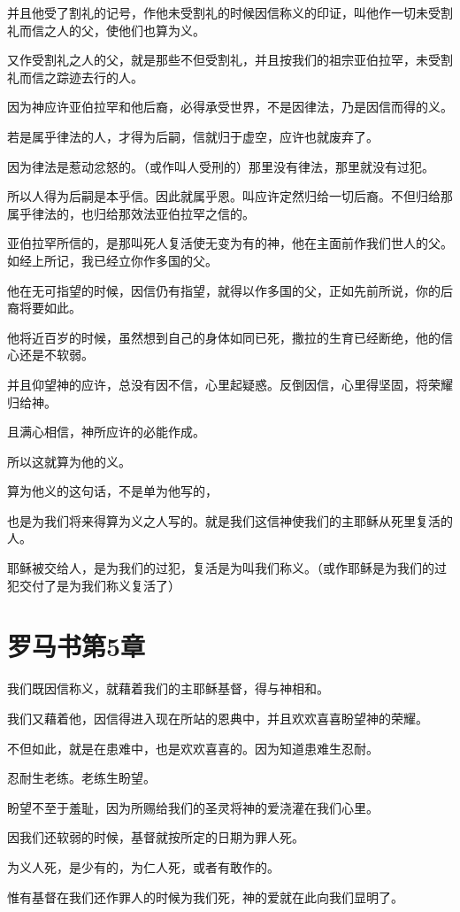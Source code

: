 \documentclass[12pt,oneside]{book}
\begin{document}
并且他受了割礼的记号，作他未受割礼的时候因信称义的印证，叫他作一切未受割礼而信之人的父，使他们也算为义。

又作受割礼之人的父，就是那些不但受割礼，并且按我们的祖宗亚伯拉罕，未受割礼而信之踪迹去行的人。

因为神应许亚伯拉罕和他后裔，必得承受世界，不是因律法，乃是因信而得的义。

若是属乎律法的人，才得为后嗣，信就归于虚空，应许也就废弃了。

因为律法是惹动忿怒的。（或作叫人受刑的）那里没有律法，那里就没有过犯。

所以人得为后嗣是本乎信。因此就属乎恩。叫应许定然归给一切后裔。不但归给那属乎律法的，也归给那效法亚伯拉罕之信的。

亚伯拉罕所信的，是那叫死人复活使无变为有的神，他在主面前作我们世人的父。如经上所记，我已经立你作多国的父。

他在无可指望的时候，因信仍有指望，就得以作多国的父，正如先前所说，你的后裔将要如此。

他将近百岁的时候，虽然想到自己的身体如同已死，撒拉的生育已经断绝，他的信心还是不软弱。

并且仰望神的应许，总没有因不信，心里起疑惑。反倒因信，心里得坚固，将荣耀归给神。

且满心相信，神所应许的必能作成。

所以这就算为他的义。

算为他义的这句话，不是单为他写的，

也是为我们将来得算为义之人写的。就是我们这信神使我们的主耶稣从死里复活的人。

耶稣被交给人，是为我们的过犯，复活是为叫我们称义。（或作耶稣是为我们的过犯交付了是为我们称义复活了）

\chapter{罗马书第5章}
我们既因信称义，就藉着我们的主耶稣基督，得与神相和。

我们又藉着他，因信得进入现在所站的恩典中，并且欢欢喜喜盼望神的荣耀。

不但如此，就是在患难中，也是欢欢喜喜的。因为知道患难生忍耐。

忍耐生老练。老练生盼望。

盼望不至于羞耻，因为所赐给我们的圣灵将神的爱浇灌在我们心里。

因我们还软弱的时候，基督就按所定的日期为罪人死。

为义人死，是少有的，为仁人死，或者有敢作的。

惟有基督在我们还作罪人的时候为我们死，神的爱就在此向我们显明了。
\end{document}
